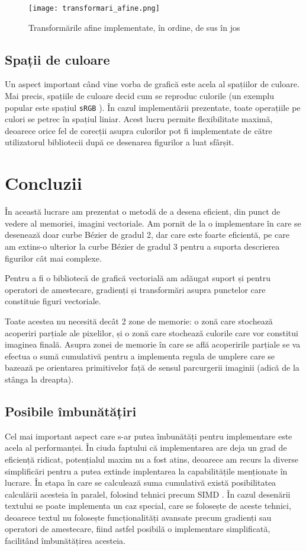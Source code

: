 \documentclass[a4paper, 12pt]{report}
\begin{document}
\begin{figure}[ht]
    \texttt{[image: transformari\_afine.png]}
    \centering
    \caption{Transformările afine implementate, în ordine, de sus în jos}
    \label{fig-transforms}
\end{figure}

\section{Spații de culoare}

Un aspect important când vine vorba de grafică este acela al spațiilor de culoare. Mai precis, spațiile de culoare decid cum
se reproduc culorile (un exemplu popular este spațiul \texttt{sRGB} \cite{sRGB}). În cazul implementării prezentate, toate operațiile
pe culori se petrec în spațiul liniar. Acest lucru permite flexibilitate maximă, deoarece orice fel de corecții asupra
culorilor pot fi implementate de către utilizatorul bibliotecii după ce desenarea figurilor a luat sfârșit.

\chapter{Concluzii}

În această lucrare am prezentat o metodă de a desena eficient, din punct de vedere al memoriei, imagini vectoriale. Am pornit
de la o implementare în care se desenează doar curbe Bézier de gradul 2, dar care este foarte eficientă, pe care am extins-o
ulterior la curbe Bézier de gradul 3 pentru a suporta descrierea figurilor cât mai complexe.

Pentru a fi o bibliotecă de grafică vectorială am adăugat suport și pentru operatori de amestecare, gradienți și transformări
asupra punctelor care constituie figuri vectoriale.

Toate acestea nu necesită decât 2 zone de memorie: o zonă care stochează acoperiri parțiale ale pixelilor, și o zonă care
stochează culorile care vor constitui imaginea finală. Asupra zonei de memorie în care se află acoperirile parțiale se va
efectua o sumă cumulativă pentru a implementa regula de umplere care se bazează pe orientarea primitivelor față de sensul
parcurgerii imaginii (adică de la stânga la dreapta).

\section{Posibile îmbunătățiri}

Cel mai important aspect care s-ar putea îmbunătăți pentru implementare este acela al performanței. În ciuda faptului că implementarea
are deja un grad de eficiență ridicat, potențialul maxim nu a fost atins, deoarece am recurs la diverse simplificări pentru a putea
extinde implentarea la capabilitățile menționate în lucrare. În etapa în care se calculează suma cumulativă există posibilitatea calculării
acesteia în paralel, folosind tehnici precum SIMD \cite{SIMD}. În cazul desenării textului se poate implementa un caz special, care se folosește
de aceste tehnici, deoarece textul nu folosește funcționalități avansate precum gradienți sau operatori de amestecare, fiind astfel posibilă
o implementare simplificată, facilitând îmbunătățirea acesteia.
\end{document}

